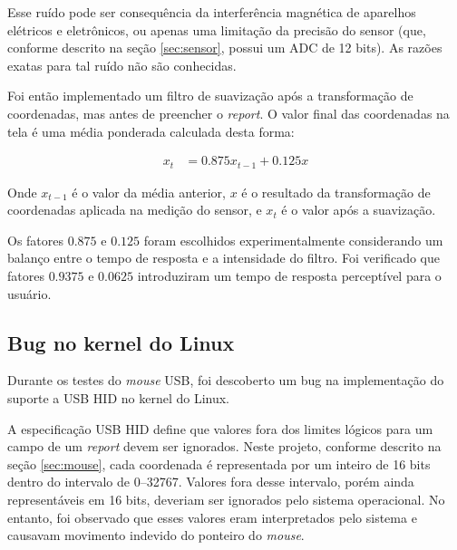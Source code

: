 \documentclass[brazil,pagestart=firstchapter]{abnt}
\begin{document}
Esse ruído pode ser consequência da interferência magnética de aparelhos
elétricos e eletrônicos, ou apenas uma limitação da precisão do sensor (que,
conforme descrito na seção \ref{sec:sensor}, possui um \ac{ADC} de 12 bits).
As razões exatas para tal ruído não são conhecidas.

Foi então implementado um filtro de suavização após a transformação de
coordenadas, mas antes de preencher o \textit{report}. O valor final das
coordenadas na tela é uma média ponderada calculada desta forma:

\begin{align*}
x_t & = 0.875 x_{t-1} + 0.125 x
\end{align*}

Onde $x_{t-1}$ é o valor da média anterior, $x$ é o resultado da
transformação de coordenadas aplicada na medição do sensor, e $x_t$ é o
valor após a suavização.




Os fatores $0.875$ e $0.125$ foram escolhidos experimentalmente considerando
um balanço entre o tempo de resposta e a intensidade do filtro. Foi
verificado que fatores $0.9375$ e $0.0625$ introduziram um tempo de resposta
perceptível para o usuário.


\subsection{Bug no kernel do Linux}
\label{sub:linux_hid_bug}

Durante os testes do \textit{mouse} \ac{USB}, foi descoberto um bug na
implementação do suporte a \ac{USB} \ac{HID} no kernel do Linux.

A especificação \ac{USB} \ac{HID} define que valores fora dos limites
lógicos para um campo de um \textit{report} devem ser ignorados.
\cite[p.~20]{usbhid} Neste projeto, conforme descrito na seção
\ref{sec:mouse}, cada coordenada é representada por um inteiro de 16 bits
dentro do intervalo de \numrange{0}{32767}. Valores fora desse intervalo,
porém ainda representáveis em 16 bits, deveriam ser ignorados pelo sistema
operacional. No entanto, foi observado que esses valores eram interpretados
pelo sistema e causavam movimento indevido do ponteiro do \textit{mouse}.
\end{document}

